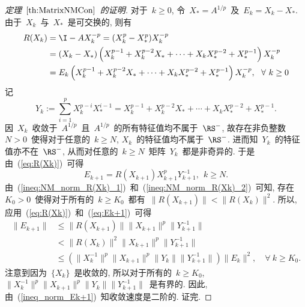 \begin{proof}[定理~$\ref{th:MatrixNMCon}$~的证明]
对于~$k \geq 0$, 令~$X_* = A^{1/p}$~及~$E_k = X_k - X_*$.
由于~$X_k$~与~$X_*$~是可交换的, 则有
\begin{align}
R(X_k) & = \I - AX_k^{-p} = (X_k^p - X_*^p)X_k^{-p} \nonumber\\
& = (X_k - X_*)\left(X_k^{p - 1} + X_k^{p - 2}X_* + \cdots +
X_k X_*^{p - 2} + X_*^{p - 1}\right)X_k^{-p} \nonumber\\
& = E_k \left(X_k^{p - 1} + X_k^{p - 2}X_* + \cdots + X_k X_*^{p -
2} + X_*^{p - 1}\right) X_k^{-p}, \ \ \forall \ k \geq 0
\label{eq:R(Xk)}
\end{align}
记
$$
Y_k := \sum_{i = 1}^p X_k^{p - i} X_*^{i - 1} = X_k^{p - 1} + X_k^{p
- 2}X_* + \cdots + X_k X_*^{p - 2} + X_*^{p - 1}.
$$
%
因~$X_k$~收敛于~$A^{1/p}$~且~$A^{1/p}$~的所有特征值均不属于~$\RS^-$,
故存在非负整数~$N > 0$~使得对于任意的~$k \geq N$,
$X_k$~的特征值均不属于~$\RS^-$. 进而知~$Y_k$~的特征值亦不在~$\RS^-$,
从而对任意的~$k \geq N$~矩阵~$Y_k$~都是非奇异的.
于是由~(\ref{eq:R(Xk)})~可得
\begin{equation}
\label{eq:Ek+1} E_{k + 1} = R(X_{k + 1}) X_{k + 1}^p Y_{k + 1}^{-1},
\ \ k \geq N.
\end{equation}
%
由~(\ref{ineq:NM_norm_R(Xk)_1})~和~(\ref{ineq:NM_norm_R(Xk)_2})~可知,
存在~$K_0 > 0$~使得对于所有的~$k \geq K_0$~都有~$\|R(X_{k + 1})\| <
\|R(X_{k})\|^2$. 所以, 应用~(\ref{eq:R(Xk)})~和~(\ref{eq:Ek+1})~可得
\begin{align}
\|E_{k + 1}\| & \leq \|R(X_{k + 1})\| \|X_{k + 1}\|^p \|Y_{k + 1}^{-1}\| \nonumber\\
& < \|R(X_k)\|^2 \|X_{k + 1}\|^p \|Y_{k + 1}^{-1}\| \nonumber\\
& \leq \left(\|X_k^{-1}\|^p\|X_{k + 1}\|^p \|Y_k\|\|Y_{k +
1}^{-1}\|\right) \|E_k\|^2, \quad \forall \ k \geq K_0.
\label{ineq_norm_Ek+1}
\end{align}
%
注意到因为~$\{X_k\}$~是收敛的, 所以对于所有的~$k \geq K_0$,
$\|X_k^{-1}\|^p\|X_{k + 1}\|^p \|Y_k\|\|Y_{k + 1}^{-1}\|$~是有界的.
因此, 由~(\ref{ineq_norm_Ek+1})~知收敛速度是二阶的. 证完.
\end{proof}






